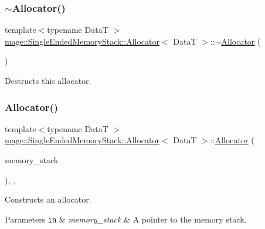 \subsubsection{\texorpdfstring{$\sim$\+Allocator()}{~Allocator()}}
{\footnotesize\ttfamily template$<$typename DataT $>$ \\
\hyperlink{classmage_1_1_single_ended_memory_stack_1_1_allocator}{mage\+::\+Single\+Ended\+Memory\+Stack\+::\+Allocator}$<$ DataT $>$\+::$\sim$\hyperlink{classmage_1_1_single_ended_memory_stack_1_1_allocator}{Allocator} (\begin{DoxyParamCaption}{ }\end{DoxyParamCaption})\hspace{0.3cm}{\ttfamily [default]}}

Destructs this allocator. \hypertarget{classmage_1_1_single_ended_memory_stack_1_1_allocator_a5e1c5692c525deba61702308b689f147}{}\label{classmage_1_1_single_ended_memory_stack_1_1_allocator_a5e1c5692c525deba61702308b689f147} 
\subsubsection{\texorpdfstring{Allocator()}{Allocator()}\hspace{0.1cm}{\footnotesize\ttfamily [4/4]}}
{\footnotesize\ttfamily template$<$typename DataT $>$ \\
\hyperlink{classmage_1_1_single_ended_memory_stack_1_1_allocator}{mage\+::\+Single\+Ended\+Memory\+Stack\+::\+Allocator}$<$ DataT $>$\+::\hyperlink{classmage_1_1_single_ended_memory_stack_1_1_allocator}{Allocator} (\begin{DoxyParamCaption}\item[{\hyperlink{namespacemage_a8769f9d670d6b585ea306cb1062af94b}{Not\+Null}$<$ \hyperlink{classmage_1_1_single_ended_memory_stack}{Single\+Ended\+Memory\+Stack} $\ast$ $>$}]{memory\+\_\+stack }\end{DoxyParamCaption})\hspace{0.3cm}{\ttfamily [explicit]}, {\ttfamily [private]}, {\ttfamily [noexcept]}}

Constructs an allocator.


\begin{DoxyParams}[1]{Parameters}
\mbox{\tt in}  & {\em memory\+\_\+stack} & A pointer to the memory stack. \\
\hline
\end{DoxyParams}



